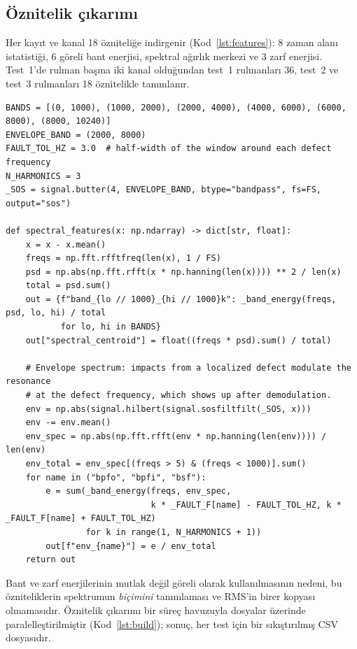 \documentclass[11pt]{article}
\begin{document}
\subsection{Öznitelik çıkarımı}
Her kayıt ve kanal 18 özniteliğe indirgenir (Kod~\ref{lst:features}): 8 zaman alanı istatistiği, 6
göreli bant enerjisi, spektral ağırlık merkezi ve 3 zarf enerjisi. Test~1'de rulman başına iki kanal
olduğundan test~1 rulmanları 36, test~2 ve test~3 rulmanları 18 öznitelikle tanımlanır.

\begin{lstlisting}[caption={Spektral ve zarf öznitelikleri (\code{src/bearing\_efw/features.py}'den alıntı).},label=lst:features]
BANDS = [(0, 1000), (1000, 2000), (2000, 4000), (4000, 6000), (6000, 8000), (8000, 10240)]
ENVELOPE_BAND = (2000, 8000)
FAULT_TOL_HZ = 3.0  # half-width of the window around each defect frequency
N_HARMONICS = 3
_SOS = signal.butter(4, ENVELOPE_BAND, btype="bandpass", fs=FS, output="sos")

def spectral_features(x: np.ndarray) -> dict[str, float]:
    x = x - x.mean()
    freqs = np.fft.rfftfreq(len(x), 1 / FS)
    psd = np.abs(np.fft.rfft(x * np.hanning(len(x)))) ** 2 / len(x)
    total = psd.sum()
    out = {f"band_{lo // 1000}_{hi // 1000}k": _band_energy(freqs, psd, lo, hi) / total
           for lo, hi in BANDS}
    out["spectral_centroid"] = float((freqs * psd).sum() / total)

    # Envelope spectrum: impacts from a localized defect modulate the resonance
    # at the defect frequency, which shows up after demodulation.
    env = np.abs(signal.hilbert(signal.sosfiltfilt(_SOS, x)))
    env -= env.mean()
    env_spec = np.abs(np.fft.rfft(env * np.hanning(len(env)))) / len(env)
    env_total = env_spec[(freqs > 5) & (freqs < 1000)].sum()
    for name in ("bpfo", "bpfi", "bsf"):
        e = sum(_band_energy(freqs, env_spec,
                             k * _FAULT_F[name] - FAULT_TOL_HZ, k * _FAULT_F[name] + FAULT_TOL_HZ)
                for k in range(1, N_HARMONICS + 1))
        out[f"env_{name}"] = e / env_total
    return out
\end{lstlisting}

Bant ve zarf enerjilerinin mutlak değil göreli olarak kullanılmasının nedeni, bu özniteliklerin
spektrumun \emph{biçimini} tanımlaması ve RMS'in birer kopyası olmamasıdır. Öznitelik çıkarımı bir süreç
havuzuyla dosyalar üzerinde paralelleştirilmiştir (Kod~\ref{lst:build}); sonuç, her test için bir
sıkıştırılmış CSV dosyasıdır.
\end{document}

